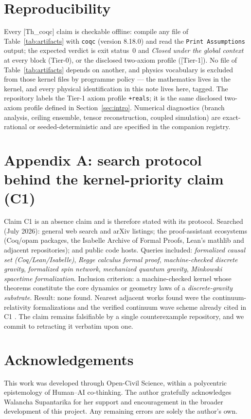 \documentclass[10pt,twocolumn]{article}
\theoremstyle{definition}
\newcommand{\Thq}{\textsf{[Th\_coqc]}}
\newcommand{\Tone}{\textsf{[Tier-1]}}
\newcommand{\code}[1]{\texttt{#1}}
\begin{document}
\section{Reproducibility}\label{sec:repro}

Every \Thq{} claim is checkable offline: compile any file of
Table~\ref{tab:artifacts} with \code{coqc} (version 8.18.0) and read the
\code{Print Assumptions} output; the expected verdict is exit status~0 and
\emph{Closed under the global context} at every block (Tier-0), or the disclosed
two-axiom profile (\Tone{}). No file of Table~\ref{tab:artifacts} depends on another, and physics vocabulary
is excluded from those kernel files by programme policy --- the mathematics lives in
the kernel, and every physical identification in this note lives here, tagged. The
repository labels the Tier-1 axiom profile \code{+reals}; it is the same disclosed
two-axiom profile defined in Section~\ref{sec:intro}.
Numerical diagnostics (branch analysis, ceiling ensemble, tensor reconstruction,
coupled simulation) are exact-rational or seeded-deterministic and are specified in
the companion registry.

\section*{Appendix A: search protocol behind the kernel-priority claim (C1)}
Claim C1 is an absence claim and is therefore stated with its protocol. Searched
(July 2026): general web search and arXiv listings; the proof-assistant ecosystems
(Coq/opam packages, the Isabelle Archive of Formal Proofs, Lean's mathlib and
adjacent repositories); and public code hosts. Queries included: \emph{formalized
causal set (Coq/Lean/Isabelle)}, \emph{Regge calculus formal proof}, \emph{machine-checked
discrete gravity}, \emph{formalized spin network}, \emph{mechanized quantum
gravity}, \emph{Minkowski spacetime formalization}. Inclusion criterion: a
machine-checked kernel whose theorems constitute the core dynamics or geometry laws
of a \emph{discrete-gravity substrate}. Result: none found. Nearest adjacent works
found were the continuum-relativity formalizations and the verified continuum wave
scheme already cited in C1 \cite{schutzformal,stannett,boldo}. The claim remains
falsifiable by a single counterexample repository, and we commit to retracting it
verbatim upon one.

\section*{Acknowledgements}
This work was developed through Open-Civil Science, within a polycentric epistemology
of Human--AI co-thinking. The author gratefully acknowledges Walancha Supantarika for
her support and encouragement in the broader development of this project. Any
remaining errors are solely the author's own.
\end{document}
